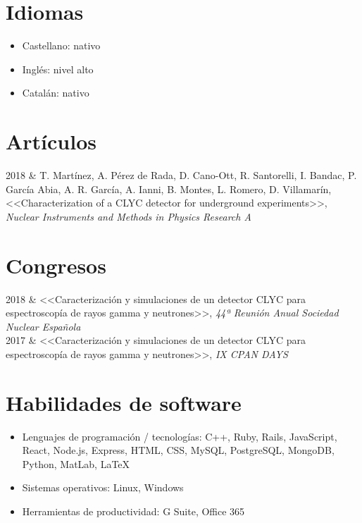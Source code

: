 \documentclass[changecolor={240, 95, 64}]{cv}
\begin{document}
\section*{Idiomas}
\begin{itemize}
  \item Castellano: nativo
  \item Inglés: nivel alto
  \item Catalán: nativo
\end{itemize}

\section*{Artículos}
\begin{tabularcv}
2018   &   T. Martínez, A. Pérez de Rada, D. Cano-Ott, R. Santorelli, I. Bandac, P. García Abia, A. R. García, A. Ianni, B. Montes, L. Romero, D. Villamarín, <<Characterization of a CLYC detector for underground experiments>>, \emph{Nuclear Instruments and Methods in Physics Research A} 
\end{tabularcv}

\section*{Congresos}
\begin{tabularcv}
2018   &   <<Caracterización y simulaciones de un detector CLYC para espectroscopía de rayos gamma y neutrones>>, \emph{44ª Reunión Anual Sociedad Nuclear Española}
           \\
2017   &   <<Caracterización y simulaciones de un detector CLYC para espectroscopía de rayos gamma y neutrones>>, \emph{IX CPAN DAYS}
\end{tabularcv}

\section*{Habilidades de software}
\begin{itemize}
  \item Lenguajes de programación / tecnologías: C++, Ruby, Rails, JavaScript, React, Node.js, Express, HTML, CSS, MySQL, PostgreSQL, MongoDB, Python, MatLab, LaTeX
  \item Sistemas operativos: Linux, Windows
  \item Herramientas de productividad: G Suite, Office 365
\end{itemize}
\end{document}
